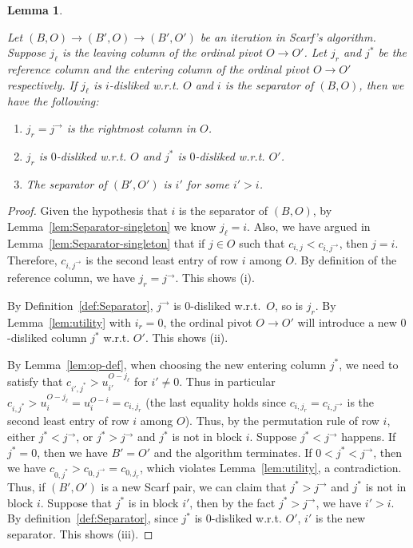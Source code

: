 \documentclass[11pt]{article}
\newtheorem{lemma}[theorem]{Lemma}
\begin{document}
\begin{lemma}\label{lem:Separator-Change}

    Let $(B,O)\to(B',O)\to(B',O')$ be an iteration in Scarf's algorithm. Suppose $j_\ell$ is the leaving column of the ordinal pivot $O\to O'$. Let $j_r$ and $j^*$ be the reference column and the entering column of the ordinal pivot $O\to O'$ respectively. If $j_\ell$ is $i$-disliked w.r.t. $O$ and $i$ is the separator of $(B, O)$, then we have the following:
\begin{enumerate}
        \item[(i)] $j_r=j^\rightarrow$ is the rightmost column in $O$.
        \item[(ii)] $j_r$ is $0$-disliked w.r.t. $O$ and $j^*$ is $0$-disliked w.r.t. $O'$.
        \item[(iii)] The separator of $(B',O')$ is $i'$ for some $i'>i$.
    \end{enumerate}
    
\end{lemma}


\begin{proof}
Given the hypothesis that $i$ is the separator of $(B,O)$, by Lemma~\ref{lem:Separator-singleton} we know $j_\ell=i$. Also, we have argued in Lemma~\ref{lem:Separator-singleton} that if $j\in O$ such that $c_{i,j}<c_{i,j^\rightarrow}$, then $j=i$. Therefore, $c_{i,j^\rightarrow}$ is the second least entry of row $i$ among $O$. By definition of the reference column, we have $j_r=j^\rightarrow$. This shows (i).

By Definition~\ref{def:Separator}, $j^{\rightarrow}$ is $0$-disliked w.r.t.~$O$, so is $j_r$. By Lemma~\ref{lem:utility} with $i_r=0$, the ordinal pivot $O\to O'$ will introduce a new $0$-disliked column $j^*$ w.r.t. $O'$. This shows (ii).

By Lemma~\ref{lem:op-def}, when choosing the new entering column $j^*$, we need to satisfy that $c_{i',j^*}>u_{i'}^{O-j_\ell}$ for $i'\neq 0$. Thus in particular $c_{i,j^*}>u_i^{O-j_\ell}=u_i^{O-i}=c_{i,j_r}$ (the last equality holds since $c_{i,j_r}=c_{i,j^\rightarrow}$ is the second least entry of row $i$ among $O$). Thus, by the permutation rule of row $i$, either $j^*<j^\rightarrow$, or $j^*>j^\rightarrow$ and $j^*$ is not in block $i$. Suppose $j^*<j^\rightarrow$ happens. If $j^*=0$, then we have $B'=O'$ and the algorithm terminates. If $0<j^*<j^\rightarrow$, then we have $c_{0,j^*}>c_{0,j^\rightarrow}=c_{0,j_r}$, which violates Lemma~\ref{lem:utility}, a contradiction. Thus, if $(B',O')$ is a new Scarf pair, we can claim that $j^*>j^\rightarrow$ and $j^*$ is not in block $i$. Suppose that $j^*$ is in block $i'$, then by the fact $j^*>j^\rightarrow$, we have $i'>i$. By definition~\ref{def:Separator}, since $j^*$ is $0$-disliked w.r.t. $O'$, $i'$ is the new separator. This shows (iii). \end{proof}
\end{document}
